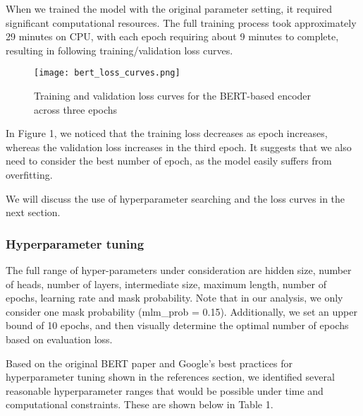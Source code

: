 \documentclass[12pt,letterpaper]{article}
\begin{document}
When we trained the model with the original parameter setting, it required significant computational resources. The full training process took approximately 29 minutes on CPU, with each epoch requiring about 9 minutes to complete, resulting in following training/validation loss curves.


\begin{figure}[H]
  \centering
  \texttt{[image: bert\_loss\_curves.png]}
  \caption{Training and validation loss curves for the BERT-based encoder across three epochs}
  \label{fig:mlm_loss}
\end{figure}

 In Figure 1, we noticed that the training loss decreases as epoch increases, whereas the validation loss increases in the third epoch. It suggests that we also need to consider the best number of epoch, as the model easily suffers from overfitting.


We will discuss the use of hyperparameter searching and the loss curves in the next section.


\subsubsection{Hyperparameter tuning}

The full range of hyper-parameters under consideration are hidden size, number of heads, number of layers, intermediate size, maximum length, number of epochs, learning rate and mask probability. Note that in our analysis, we only consider one mask probability (mlm\_prob = 0.15). Additionally, we set an upper bound of 10 epochs, and then visually determine the optimal number of epochs based on evaluation loss. 

Based on the original BERT paper and Google's best practices for hyperparameter tuning shown in the references section, we identified several reasonable hyperparameter ranges that would be possible under time and computational constraints. These are shown below in Table 1.
\end{document}
